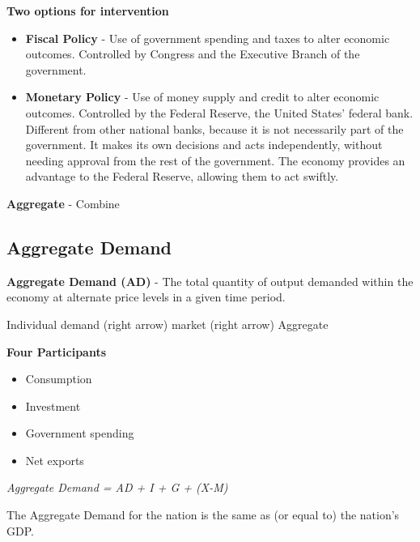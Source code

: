 \documentclass{article}
\begin{document}
\textbf{Two options for intervention}
\begin{itemize}
    \item{\textbf{Fiscal Policy} - Use of government spending and taxes to alter economic outcomes. Controlled by Congress and the Executive Branch of the government.}
    \item{\textbf{Monetary Policy} - Use of money supply and credit to alter economic outcomes. Controlled by the Federal Reserve, the United States' federal bank. Different from other national banks, because it is not necessarily part of the government. It makes its own decisions and acts independently, without needing approval from the rest of the government. The economy provides an advantage to the Federal Reserve, allowing them to act swiftly.}
\end{itemize}

\textbf{Aggregate} - Combine

\subsection{Aggregate Demand}
\textbf{Aggregate Demand (AD)} - The total quantity of output demanded within the economy at alternate price levels in a given time period.

Individual demand (right arrow) market (right arrow) Aggregate

\textbf{Four Participants}
\begin{itemize}
    \item{Consumption}
    \item{Investment}
    \item{Government spending}
    \item{Net exports}
\end{itemize}

\textit{Aggregate Demand = AD + I + G + (X-M)}

The Aggregate Demand for the nation is the same as (or equal to) the nation's GDP.
\end{document}
